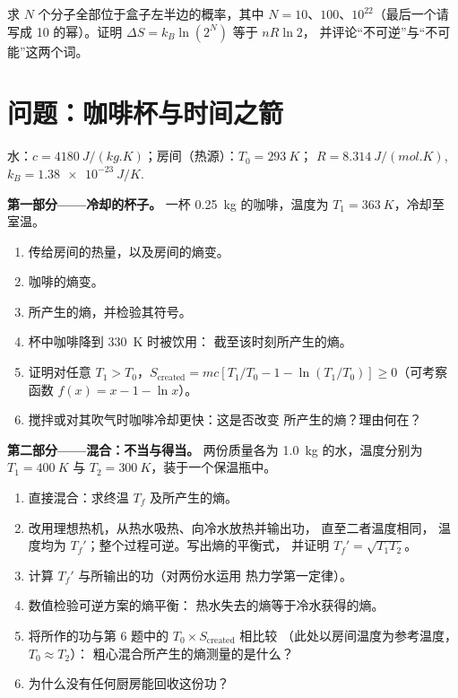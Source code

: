 \begin{exercise}[$\star\star\star$]\label{exo:b1:second-law-entropy:12}
求 $N$ 个分子全部位于盒子左半边的概率，其中
$N = 10$、$100$、$10^{22}$（最后一个请写成 10 的幂）。证明
$\Delta S = k_B\ln(2^N)$ 等于 $nR\ln2$，
并评论“不可逆”与“不可能”这两个词。
\end{exercise}

\section{问题：咖啡杯与时间之箭}

\begin{problem}
\label{pb:b1:second-law-entropy:1}
水：$c = \qty{4180}{J/(kg.K)}$；房间（热源）：$T_0 = \qty{293}{K}$；
$R = \qty{8.314}{J/(mol.K)}$, $k_B = \qty{1.38e-23}{J/K}$.

\medskip
\noindent\textbf{第一部分——冷却的杯子。}
一杯 \qty{0.25}{kg} 的咖啡，温度为 $T_1 = \qty{363}{K}$，冷却至
室温。
\begin{enumerate}
  \item 传给房间的热量，以及房间的熵变。
  \item 咖啡的熵变。
  \item 所产生的熵，并检验其符号。
  \item 杯中咖啡降到 \qty{330}{K} 时被饮用：
        截至该时刻所产生的熵。
  \item 证明对任意 $T_1 > T_0$，$S_{\mathrm{created}} = mc[T_1/T_0 - 1 -
        \ln(T_1/T_0)] \geq 0$（可考察函数 $f(x) = x - 1 - \ln x$）。
  \item 搅拌或对其吹气时咖啡冷却更快：这是否改变
        所产生的熵？理由何在？
\end{enumerate}

\medskip
\noindent\textbf{第二部分——混合：不当与得当。}
两份质量各为 \qty{1.0}{kg} 的水，温度分别为 $T_1 = \qty{400}{K}$ 与 $T_2 =
\qty{300}{K}$，装于一个保温瓶中。
\begin{enumerate}[resume]
  \item 直接混合：求终温 $T_f$ 及所产生的熵。
  \item 改用理想热机，从热水吸热、向冷水放热并输出功，
        直至二者温度相同，
        温度均为 $T_f'$；整个过程可逆。写出熵的平衡式，
        并证明 $T_f' = \sqrt{T_1T_2}$。
  \item 计算 $T_f'$ 与所输出的功（对两份水运用
        热力学第一定律）。
  \item 数值检验可逆方案的熵平衡：
        热水失去的熵等于冷水获得的熵。
  \item 将所作的功与第 6 题中的 $T_0 \times S_{\mathrm{created}}$ 相比较
        （此处以房间温度为参考温度，$T_0 \approx T_2$）：
        粗心混合所产生的熵测量的是什么？
  \item 为什么没有任何厨房能回收这份功？
\end{enumerate}


\end{problem}
